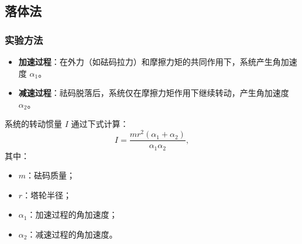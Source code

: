 \documentclass[12pt,hyperref,a4paper,UTF8]{ctexart}
\begin{document}
\subsection{落体法}
\subsubsection{实验方法}
\begin{itemize}
    \item \textbf{加速过程}：在外力（如砝码拉力）和摩擦力矩的共同作用下，系统产生角加速度 $\alpha_1$。
    \item \textbf{减速过程}：祛码脱落后，系统仅在摩擦力矩作用下继续转动，产生角加速度 $\alpha_2$。
\end{itemize}

系统的转动惯量 $I$ 通过下式计算：
\begin{equation}
    I = \frac{m r^2 (\alpha_1 + \alpha_2)}{\alpha_1 \alpha_2},
\end{equation}
其中：
\begin{itemize}
    \item $m$：砝码质量；
    \item $r$：塔轮半径；
    \item $\alpha_1$：加速过程的角加速度；
    \item $\alpha_2$：减速过程的角加速度。
\end{itemize}
\end{document}

